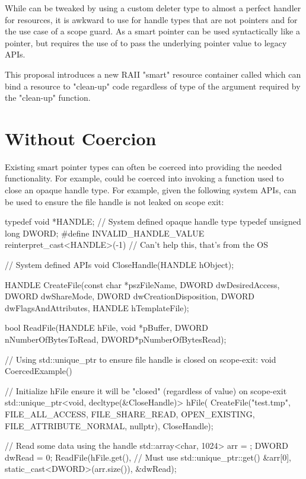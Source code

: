 \documentclass[ebook,11pt,article]{memoir}
\begin{document}
While  can be tweaked by using a custom deleter type to almost a perfect handler for resources, it is awkward to use for handle types that are not pointers and for the use case of a scope guard. As a smart pointer   can be used syntactically like a pointer, but requires the use of  to pass the underlying pointer value to legacy APIs.

This proposal introduces a new RAII "smart" resource container called  which can bind a resource to "clean-up" code regardless of type of the argument required by the "clean-up" function.

\section {Without Coercion}
Existing smart pointer types can often be coerced into providing the needed functionality.  For example,  could be coerced into invoking a function used to close an opaque handle type.  For example, given the following system APIs,  can be used to ensure the file handle is not leaked on scope exit:

\begin{codeblock}
typedef void *HANDLE;        // System defined opaque handle type
typedef unsigned long DWORD;
#define INVALID_HANDLE_VALUE reinterpret_cast<HANDLE>(-1)	
// Can't help this, that's from the OS

// System defined APIs
void CloseHandle(HANDLE hObject);

HANDLE CreateFile(const char *pszFileName, 
	DWORD dwDesiredAccess, 
	DWORD dwShareMode, 
	DWORD dwCreationDisposition, 
	DWORD dwFlagsAndAttributes, 
	HANDLE hTemplateFile);

bool ReadFile(HANDLE hFile, 
	void *pBuffer, 
	DWORD nNumberOfBytesToRead, 
	DWORD*pNumberOfBytesRead);

// Using std::unique_ptr to ensure file handle is closed on scope-exit:
void CoercedExample()
{
	// Initialize hFile ensure it will be "closed" (regardless of value) on scope-exit
	std::unique_ptr<void, decltype(&CloseHandle)> hFile(
		CreateFile("test.tmp", 
			FILE_ALL_ACCESS, 
			FILE_SHARE_READ, 
			OPEN_EXISTING, 
			FILE_ATTRIBUTE_NORMAL,
			nullptr), 
		CloseHandle);

	// Read some data using the handle
	std::array<char, 1024> arr = { };
	DWORD dwRead = 0;
	ReadFile(hFile.get(),	// Must use std::unique_ptr::get()
		&arr[0], 
		static_cast<DWORD>(arr.size()), 
		&dwRead);
}
\end{codeblock}
\end{document}

